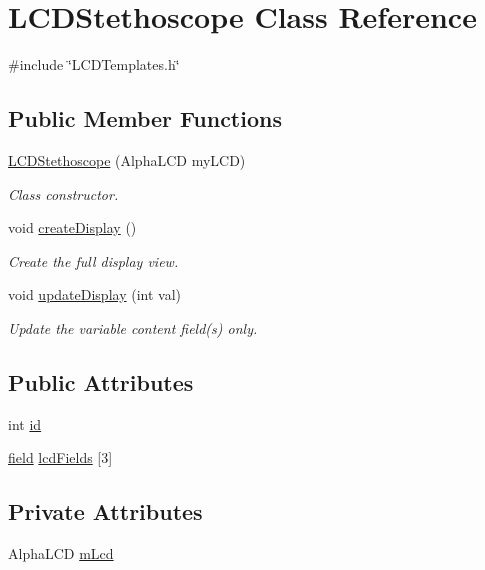 \hypertarget{class_l_c_d_stethoscope}{\section{L\-C\-D\-Stethoscope Class Reference}
\label{class_l_c_d_stethoscope}
}


{\ttfamily \#include \char`\"{}L\-C\-D\-Templates.\-h\char`\"{}}

\subsection*{Public Member Functions}
\begin{DoxyCompactItemize}
\item 
\hyperlink{class_l_c_d_stethoscope_af9f8f2067a0b31bffa6fbc6a3db86287}{L\-C\-D\-Stethoscope} (Alpha\-L\-C\-D my\-L\-C\-D)
\begin{DoxyCompactList}\small\item\em Class constructor. \end{DoxyCompactList}\item 
void \hyperlink{class_l_c_d_stethoscope_a2641dd844d4070d6f498ba20c04cdfac}{create\-Display} ()
\begin{DoxyCompactList}\small\item\em Create the full display view. \end{DoxyCompactList}\item 
void \hyperlink{class_l_c_d_stethoscope_a6b1c171fbe2cc21944e26af50135ba31}{update\-Display} (int val)
\begin{DoxyCompactList}\small\item\em Update the variable content field(s) only. \end{DoxyCompactList}\end{DoxyCompactItemize}
\subsection*{Public Attributes}
\begin{DoxyCompactItemize}
\item 
int \hyperlink{class_l_c_d_stethoscope_a865d5b5da67eb0841c34b1a436ef28ba}{id}
\item 
\hyperlink{_l_c_d_templates_8h_a20a49e010fbfc3a43959f12d92e01bb6}{field} \hyperlink{class_l_c_d_stethoscope_ad36003e685beee5f2268fd4ef1f0db8c}{lcd\-Fields} \mbox{[}3\mbox{]}
\end{DoxyCompactItemize}
\subsection*{Private Attributes}
\begin{DoxyCompactItemize}
\item 
Alpha\-L\-C\-D \hyperlink{class_l_c_d_stethoscope_af91304920f29b700ae27aee8aba23ac1}{m\-Lcd}
\end{DoxyCompactItemize}


